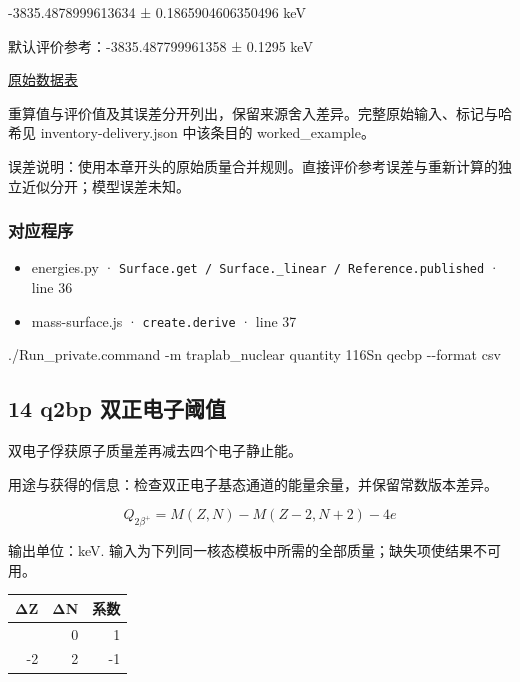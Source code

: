 \documentclass[
  11pt,
  letterpaper,
]{article}
\newenvironment{Shaded}{}{}
\newcommand{\AttributeTok}[1]{\textcolor[rgb]{0.49,0.56,0.16}{#1}}
\newcommand{\ExtensionTok}[1]{#1}
\newcommand{\NormalTok}[1]{#1}
\providecommand{\tightlist}{%
  \setlength{\itemsep}{0pt}\setlength{\parskip}{0pt}}
\begin{document}
-3835.4878999613634 ± 0.1865904606350496 keV

默认评价参考：-3835.487799961358 ± 0.1295 keV

\href{https://www-nds.iaea.org/amdc/ame2020/rct1.mas20.txt}{原始数据表}

重算值与评价值及其误差分开列出，保留来源舍入差异。完整原始输入、标记与哈希见
inventory-delivery.json 中该条目的 worked\_example。

误差说明：使用本章开头的原始质量合并规则。直接评价参考误差与重新计算的独立近似分开；模型误差未知。

\subsubsection{对应程序}\label{ux5bf9ux5e94ux7a0bux5e8f-12}

\begin{itemize}
\tightlist
\item
  energies.py ·
  \texttt{Surface.get\ /\ Surface.\_linear\ /\ Reference.published} ·
  line 36
\item
  mass-surface.js · \texttt{create.derive} · line 37
\end{itemize}

\begin{Shaded}
\begin{Highlighting}[]
\ExtensionTok{./Run\_private.command} \AttributeTok{{-}m}\NormalTok{ traplab\_nuclear quantity 116Sn qecbp }\AttributeTok{{-}{-}format}\NormalTok{ csv}
\end{Highlighting}
\end{Shaded}

\subsection{14 q2bp
双正电子阈值}\label{q2bp-ux53ccux6b63ux7535ux5b50ux9608ux503c}

双电子俘获原子质量差再减去四个电子静止能。

用途与获得的信息：检查双正电子基态通道的能量余量，并保留常数版本差异。

\[
Q_{2\beta^+}=M(Z,N)-M(Z-2,N+2)-4e
\]

输出单位：keV.
输入为下列同一核态模板中所需的全部质量；缺失项使结果不可用。

\begin{longtable}[]{@{}rrr@{}}
\toprule\noalign{}
ΔZ & ΔN & 系数 \\
\midrule\noalign{}
\endhead
\bottomrule\noalign{}
\endlastfoot
0 & 0 & 1 \\
-2 & 2 & -1 \\
\end{longtable}
\end{document}
